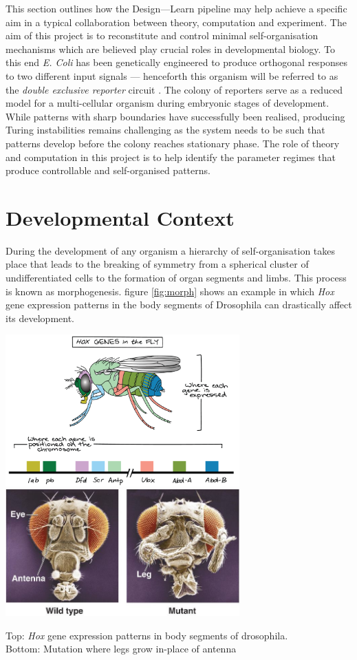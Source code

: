This section outlines how the Design---Learn pipeline may help achieve a specific
aim in a typical collaboration between theory, computation and experiment.
The aim of this project is to reconstitute and control minimal self-organisation
mechanisms which are believed play crucial roles in developmental biology. To this
end \textit{E. Coli} has been genetically engineered to produce orthogonal responses
to two different input signals --- henceforth this organism will be referred to as the
\textit{double exclusive reporter} circuit \cite{Grant2016}. The colony of reporters
serve as a reduced model for a multi-cellular organism during embryonic stages of
development. While patterns with sharp boundaries have successfully been realised,
producing Turing instabilities remains challenging as the system needs to be such
that patterns develop before the colony reaches stationary phase.
The role of theory and computation in this project is to help identify the
parameter regimes that produce controllable and self-organised patterns.

\section{Developmental Context}
During the development of any organism a hierarchy of self-organisation takes place that leads
to the breaking of symmetry from a spherical cluster of undifferentiated cells to the formation
of organ segments and limbs. This process is known as morphogenesis. figure \ref{fig:morph}
shows an example in which \textit{Hox} gene expression patterns in the body segments of
Drosophila can drastically affect its development.

\begin{Figure}
\includegraphics[width=90mm]{figures/morph1.png}\\
\includegraphics[width=90mm]{figures/morph2.png}
\caption{Top: \textit{Hox} gene expression patterns in body segments of drosophila.\\
Bottom: Mutation where legs grow in-place of antenna \cite{Urry2017CampbellBiology}}
\label{fig:morph}
\end{Figure}
